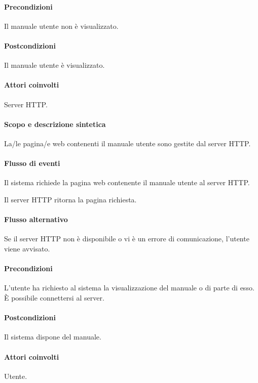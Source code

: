 \paragraph{Precondizioni} Il manuale utente non \`e visualizzato.
\paragraph{Postcondizioni} Il manuale utente \`e visualizzato.

\paragraph{Attori coinvolti} Server HTTP.
\paragraph{Scopo e descrizione sintetica}
La/le pagina/e web contenenti il manuale utente sono gestite dal server HTTP.
\paragraph{Flusso di eventi}
\begin{elenconumerato}[\textbf{}]{\subsubsecindent}
\item Il sistema richiede la pagina web contenente il manuale utente al server HTTP.
\item Il server HTTP ritorna la pagina richiesta.
\end{elenconumerato}
\paragraph{Flusso alternativo}
Se il server HTTP non \`e disponibile o vi \`e un errore di comunicazione, l'utente viene avvisato.
\paragraph{Precondizioni} L'utente ha richiesto al sistema la visualizzazione del manuale o di parte di esso. \`E possibile connettersi al server.
\paragraph{Postcondizioni} Il sistema dispone del manuale.

\paragraph{Attori coinvolti} Utente.
